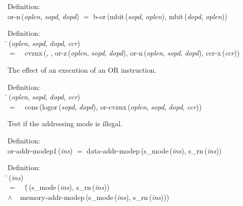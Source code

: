 \begin{tabbing}{\sc Definition}: \\  
{\rm{or-n}}\,({\it{oplen\/}}, {\it{sopd\/}}, {\it{dopd\/}}) $=$ {\rm{b-or}}\,({\rm{mbit}}\,({\it{sopd\/}}, {\it{oplen\/}}), {\rm{mbit}}\,({\it{dopd\/}}, {\it{oplen\/}}))
\end{tabbing}

\begin{tabbing}{\sc Definition}: \\  
\=\,({\it{oplen\/}}, {\it{sopd\/}}, {\it{dopd\/}}, {\it{ccr\/}}) \\ 
$=$$\;\;\;\;${\rm{cvznx}}\,({}, {}, {\rm{or-z}}\,({\it{oplen\/}}, {\it{sopd\/}}, {\it{dopd\/}}), {\rm{or-n}}\,({\it{oplen\/}}, {\it{sopd\/}}, {\it{dopd\/}}), {\rm{ccr-x}}\,({\it{ccr\/}}))\-
\end{tabbing}

 The effect of an execution of an  OR instruction.
\begin{tabbing}{\sc Definition}: \\  
\=\,({\it{oplen\/}}, {\it{sopd\/}}, {\it{dopd\/}}, {\it{ccr\/}}) \\ 
$=$$\;\;\;\;${\rm{cons}}\,({\rm{logor}}\,({\it{sopd\/}}, {\it{dopd\/}}), {\rm{or-cvznx}}\,({\it{oplen\/}}, {\it{sopd\/}}, {\it{dopd\/}}, {\it{ccr\/}}))\-
\end{tabbing}

 Test if the addressing mode is illegal.
\begin{tabbing}{\sc Definition}: \\  
{\rm{or-addr-modep1}}\,({\it{ins\/}}) $=$ {\rm{data-addr-modep}}\,({\rm{s\_mode}}\,({\it{ins\/}}), {\rm{s\_rn}}\,({\it{ins\/}}))
\end{tabbing}

\begin{tabbing}{\sc Definition}: \\  
\=\,({\it{ins\/}}) \\ 
$=$$\;\;\;\;$(\=\,({\rm{s\_mode}}\,({\it{ins\/}}), {\rm{s\_rn}}\,({\it{ins\/}})) \\ 
$\wedge$$\;\;\;\;${\rm{memory-addr-modep}}\,({\rm{s\_mode}}\,({\it{ins\/}}), {\rm{s\_rn}}\,({\it{ins\/}})))\-\-
\end{tabbing}

